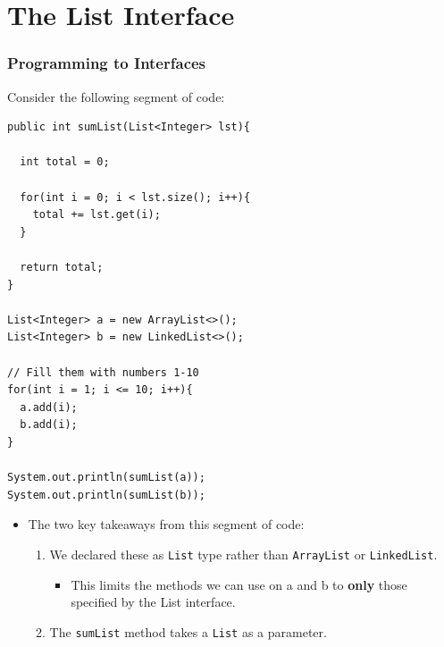 \documentclass{beamer}
\begin{document}
\section{The List Interface}
\begin{frame}[fragile]
    \frametitle{Programming to Interfaces}
    \begin{minipage}{0.49\textwidth}
    Consider the following segment of code:
    \vfill
        \begin{lstlisting}[basicstyle=\tiny, frame=trBL]
public int sumList(List<Integer> lst){

  int total = 0;

  for(int i = 0; i < lst.size(); i++){
    total += lst.get(i);
  }

  return total;
}

List<Integer> a = new ArrayList<>();
List<Integer> b = new LinkedList<>();

// Fill them with numbers 1-10
for(int i = 1; i <= 10; i++){
  a.add(i);
  b.add(i);
}

System.out.println(sumList(a));
System.out.println(sumList(b));
        \end{lstlisting}
    \end{minipage}
    \begin{minipage}{0.49\textwidth}
        \begin{itemize}
            \item The two key takeaways from this segment of code:
                \begin{enumerate}
                    \scriptsize
                    \item We declared these as \lstinline|List| type rather than \lstinline|ArrayList| or \lstinline|LinkedList|. 
                        \begin{itemize}
                            \tiny
                            \item This limits the methods we can use on a and b to \textbf{only} those specified by the List interface.
                        \end{itemize}
                    \item The \lstinline|sumList| method takes a \lstinline|List| as a parameter.
                \end{enumerate}
        \end{itemize}
    \end{minipage}
\end{frame}
\end{document}
